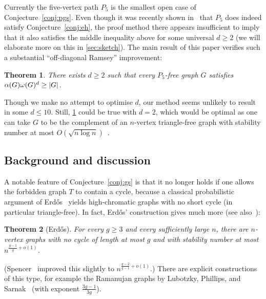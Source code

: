 \documentclass[11pt,reqno]{amsart}
\newtheorem{theorem}{Theorem}[section]
\newcommand{\dd}{\textquotedblleft}
\newcommand{\ee}{\textquotedblright}
\DeclarePairedDelimiter\abs{\lvert}{\rvert}%
\begin{document}
	Currently the five-vertex path $P_5$ is the smallest open case of Conjecture~\ref{conj:pgs}. Even though it was recently shown in~\cite{density7} that $P_5$ does indeed satisfy Conjecture~\ref{conj:eh}, the proof method there appears insufficient to imply that it also satisfies the middle inequality above for some universal $d\ge2$ (we will elaborate more on this in \cref{sec:sketch}).
	The main result of this paper verifies such a substantial \dd off-diagonal Ramsey\ee{} improvement:
	\begin{theorem}
		\label{thm:p5main}
		There exists $d\ge2$ such that every $P_5$-free graph $G$ satisfies $\alpha(G)\omega(G)^d\ge\abs G$.
	\end{theorem}
	
	Though we make no attempt to optimise $d$, our method seems unlikely to result in some $d\le10$.
	Still, \cref{thm:p5main} could be true with $d=2$, which would be optimal as one can take $G$ to be the complement of an $n$-vertex triangle-free graph with stability number at most $O(\sqrt{n\log n})$~\cite{MR1369063}.
	\subsection{Background and discussion}
	A notable feature of Conjecture~\ref{conj:gs} is that it no longer holds if one allows the forbidden graph $T$ to contain a cycle,
	because a classical probabilistic argument of Erd\H os~\cite{MR102081} yields high-chromatic graphs with no short cycle (in particular triangle-free).
	In fact, Erd\H os' construction gives much more (see also~\cite{MR3524748}):
	\begin{theorem}
		[Erd\H os]
		\label{thm:erdos}
		For every $g\ge 3$ and every sufficiently large $n$, there are $n$-vertex graphs with no cycle of length at most $g$ and with stability number at most $n^{\frac{g-1}{g}+o(1)}$.
	\end{theorem}
	(Spencer~\cite{MR491337} improved this slightly to $n^{\frac{g-2}{g-1}+o(1)}$.)
	There are explicit constructions of this type, for example the Ramanujan graphs by Lubotzky, Phillips, and Sarnak~\cite{MR963118} (with exponent $\frac{3g-1}{3g}$).
	
\end{document}
